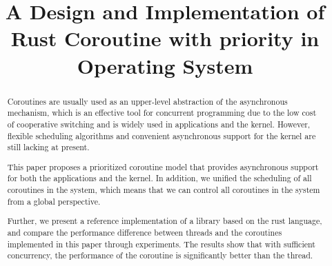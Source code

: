 \documentclass[conference]{IEEEtran}
\begin{document}
\title{A Design and Implementation of Rust Coroutine with priority in Operating System
}

\author{
\and
{}
\and
{}
\and
{}
}

\maketitle

\begin{abstract}
Coroutines are usually used as an upper-level abstraction of the asynchronous mechanism, which is an effective tool for concurrent programming due to the low cost of cooperative switching and is widely used in applications and the kernel. However, flexible scheduling algorithms and convenient asynchronous support for the kernel are still lacking at present.

This paper proposes a prioritized coroutine model that provides asynchronous support for both the applications and the kernel. In addition, we unified the scheduling of all coroutines in the system, which means that we can control all coroutines in the system from a global perspective.

Further, we present a reference implementation of a library based on the rust language, and compare the performance difference between threads and the coroutines implemented in this paper through experiments. The results show that with sufficient concurrency, the performance of the coroutine is significantly better than the thread.
\end{abstract}
\end{document}
